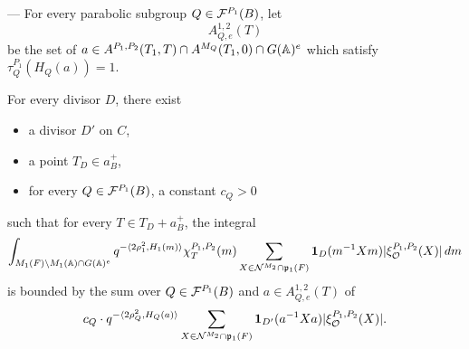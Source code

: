 \begin{paragr} --- \label{S:deuxieme-majoration} For every parabolic subgroup $Q\in \mathcal{F}^{P_1}(B)$, let
$$A^{1,2}_{Q,e}(T)$$
be the set of $a\in A^{P_1,P_2}(T_1,T)\cap A^{M_Q}(T_1,0)\cap G(\mathbb{A})^e$ which satisfy $\tau_Q^{P_1}(H_Q(a))=1$.

\begin{proposition}\label{prop:deuxieme-majoration}
  For every divisor $D$, there exist
  \begin{itemize}
  \item a divisor $D'$ on $C$,
  \item a point $T_D\in a_B^+$,
  \item for every $Q\in \mathcal{F}^{P_1}(B)$, a constant $c_Q>0$
  \end{itemize}
such that for every $T\in T_D+a_B^+$, the integral
\begin{equation}
  \label{eq:integrale-M1}
  \int_{M_1(F)\backslash M_1(\mathbb{A})\cap G(\mathbb{A})^e} q^{-\langle 2\rho_1^2,H_1(m)\rangle} \chi_T^{P_1,P_2}(m) \sum_{X\in \mathcal{N}^{M_2}\cap \mathfrak{p}_1(F)} \mathbf{1}_D(m^{-1}Xm)|\xi_{\mathcal{O}}^{P_1,P_2}(X)|\, dm
\end{equation}
is bounded by the sum over $Q\in \mathcal{F}^{P_1}(B)$ and $a\in A^{1,2}_{Q,e}(T)$ of
$$c_Q\cdot q^{-\langle 2\rho_Q^2,H_Q(a)\rangle} \sum_{X\in \mathcal{N}^{M_2}\cap \mathfrak{p}_1(F)} \mathbf{1}_{D'}(a^{-1}Xa)|\xi_{\mathcal{O}}^{P_1,P_2}(X)|.$$
\end{proposition}


\end{paragr}
